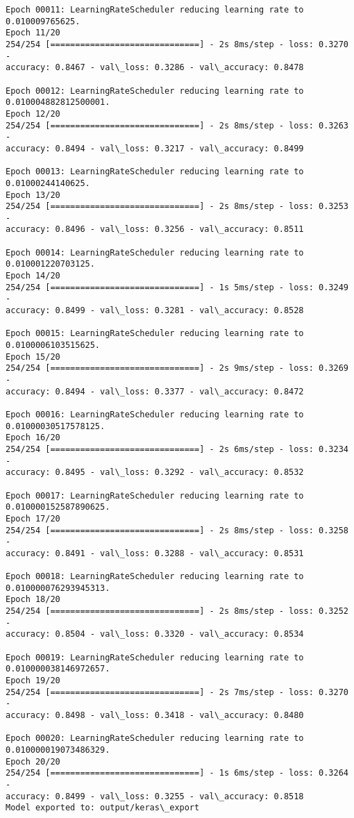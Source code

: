 \documentclass[11pt]{article}
\begin{document}
\begin{Verbatim}[commandchars=\\\{\}]
Epoch 00011: LearningRateScheduler reducing learning rate to 0.010009765625.
Epoch 11/20
254/254 [==============================] - 2s 8ms/step - loss: 0.3270 -
accuracy: 0.8467 - val\_loss: 0.3286 - val\_accuracy: 0.8478

Epoch 00012: LearningRateScheduler reducing learning rate to
0.010004882812500001.
Epoch 12/20
254/254 [==============================] - 2s 8ms/step - loss: 0.3263 -
accuracy: 0.8494 - val\_loss: 0.3217 - val\_accuracy: 0.8499

Epoch 00013: LearningRateScheduler reducing learning rate to 0.01000244140625.
Epoch 13/20
254/254 [==============================] - 2s 8ms/step - loss: 0.3253 -
accuracy: 0.8496 - val\_loss: 0.3256 - val\_accuracy: 0.8511

Epoch 00014: LearningRateScheduler reducing learning rate to 0.010001220703125.
Epoch 14/20
254/254 [==============================] - 1s 5ms/step - loss: 0.3249 -
accuracy: 0.8499 - val\_loss: 0.3281 - val\_accuracy: 0.8528

Epoch 00015: LearningRateScheduler reducing learning rate to 0.0100006103515625.
Epoch 15/20
254/254 [==============================] - 2s 9ms/step - loss: 0.3269 -
accuracy: 0.8494 - val\_loss: 0.3377 - val\_accuracy: 0.8472

Epoch 00016: LearningRateScheduler reducing learning rate to
0.01000030517578125.
Epoch 16/20
254/254 [==============================] - 2s 6ms/step - loss: 0.3234 -
accuracy: 0.8495 - val\_loss: 0.3292 - val\_accuracy: 0.8532

Epoch 00017: LearningRateScheduler reducing learning rate to
0.010000152587890625.
Epoch 17/20
254/254 [==============================] - 2s 8ms/step - loss: 0.3258 -
accuracy: 0.8491 - val\_loss: 0.3288 - val\_accuracy: 0.8531

Epoch 00018: LearningRateScheduler reducing learning rate to
0.010000076293945313.
Epoch 18/20
254/254 [==============================] - 2s 8ms/step - loss: 0.3252 -
accuracy: 0.8504 - val\_loss: 0.3320 - val\_accuracy: 0.8534

Epoch 00019: LearningRateScheduler reducing learning rate to
0.010000038146972657.
Epoch 19/20
254/254 [==============================] - 2s 7ms/step - loss: 0.3270 -
accuracy: 0.8498 - val\_loss: 0.3418 - val\_accuracy: 0.8480

Epoch 00020: LearningRateScheduler reducing learning rate to
0.010000019073486329.
Epoch 20/20
254/254 [==============================] - 1s 6ms/step - loss: 0.3264 -
accuracy: 0.8499 - val\_loss: 0.3255 - val\_accuracy: 0.8518
Model exported to: output/keras\_export
    \end{Verbatim}
\end{document}
